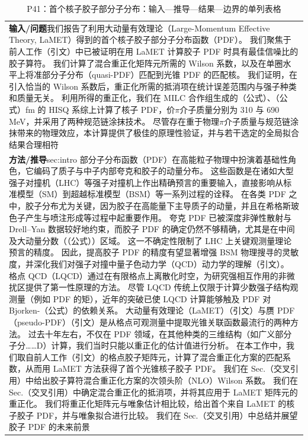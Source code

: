 \documentclass[UTF8,11pt,oneside]{ctexbook}
\begin{document}
\begin{table}[htbp]
  \centering
  \caption*{P41：首个核子胶子部分子分布：输入—推导—结果—边界的单列表格}
  \small
  \begin{tabular}{@{}p{}@{}}
    \toprule
    \textbf{输入/问题}\quad 我们报告了利用大动量有效理论（Large-Momentum Effective Theory, LaMET）得到的首个核子胶子部分子分布函数（PDF）。 我们聚焦于前人工作（引文）中已被证明在用 LaMET 计算胶子 PDF 时具有最佳信噪比的胶子算符。 我们计算了混合重正化矩阵元所需的 Wilson 系数，以及在单圈水平上将准部分子分布（quasi-PDF）匹配到光锥 PDF 的匹配核。 我们证明，在引入恰当的 Wilson 系数后，重正化所需的抵消项在统计误差范围内与强子种类和质量无关。 利用所得的重正化，我们在 MILC 合作组生成的（公式）、（公式）fm 的 HISQ 系综上计算了核子 PDF，价$\pi$介子质量分别为 310 与 690 MeV，并采用了两种规范链涂抹技术。 尽管存在重于物理$\pi$介子质量与规范链涂抹带来的物理效应，本计算提供了极佳的原理性验证，并与若干选定的全局拟合结果合理相符 \\
    \textbf{方法/推导}\quad sec:intro 部分子分布函数（PDF）在高能粒子物理中扮演着基础性角色，它编码了质子与中子内部夸克和胶子的动量分布。 这些函数是在诸如大型强子对撞机（LHC）等强子对撞机上作出精确预言的重要输入，直接影响从标准模型（SM）到超越标准模型（BSM）等一系列过程的诠释。 在各类 PDF 之中，胶子分布尤为关键，因为胶子在高能量下主导质子的动量，并且在希格斯玻色子产生与喷注形成等过程中起重要作用。 夸克 PDF 已被深度非弹性散射与 Drell–Yan 数据较好地约束，而胶子 PDF 的确定仍然不够精确，尤其是在中间及大动量分数（（公式））区域。 这一不确定性限制了 LHC 上关键观测量理论预言的精度。 因此，提高胶子 PDF 的精度有望显著增强 BSM 物理搜寻的灵敏度，并深化我们对强子对撞中量子色动力学（QCD）动力学的理解（引文）。 格点 QCD（LQCD）通过在有限格点上离散化时空，为研究强相互作用的非微扰区提供了第一性原理的方法。 尽管 LQCD 传统上仅限于计算少数强子结构观测量（例如 PDF 的矩），近年的突破已使 LQCD 计算能够触及 PDF 对 Bjorken-（公式）的依赖关系。 大动量有效理论（LaMET）（引文）与赝 PDF（pseudo-PDF）（引文）是从格点可观测量中提取光锥关联函数最流行的两种方法。 过去十年左右，不仅在 PDF 领域，在其他种类的三维结构（如广义部分子分……D）计算，我们当时只能以重正化的估计值进行分析。 在本工作中，我们取自前人工作（引文）的格点胶子矩阵元，计算了混合重正化方案的匹配系数，从而用 LaMET 方法获得了首个光锥核子胶子 PDF。 我们在 Sec.（交叉引用）中给出胶子算符混合重正化方案的次领头阶（NLO）Wilson 系数。 我们在 Sec.（交叉引用）中确定混合重正化的抵消项，并将其应用于 LaMET 矩阵元的重正化。 我们将重正化矩阵元与唯象估计相比较，给出首个来自 LaMET 的核子胶子 PDF，并与唯象拟合进行比较。 我们在 Sec.（交叉引用）中总结并展望胶子 PDF 的未来前景 \\

\end{tabular}
\end{table}
\end{document}
